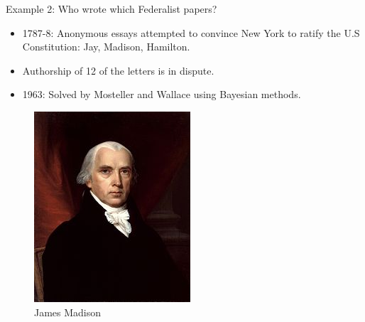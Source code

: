 \documentclass[handout]{beamer}
\begin{document}
\begin{frame}{Example 2: Who wrote which Federalist papers?}
    \scriptsize
    \begin{itemize}
        \item 1787-8: Anonymous essays attempted to convince New York to ratify the U.S Constitution: Jay, Madison, Hamilton.
        \item Authorship of 12 of the letters is in dispute.
        \item 1963: Solved by Mosteller and Wallace using Bayesian methods.
    \end{itemize}
    \vspace{5pt}
    \begin{center}
        \begin{figure}[h]
            \begin{minipage}{0.3\textwidth}
                \centering
                \includegraphics[width=\linewidth]{pics/madison.png}
                \caption{James Madison}
            \end{minipage}\hfill
            \begin{minipage}{0.3\textwidth}

\end{minipage}
\end{figure}
\end{center}
\end{frame}
\end{document}
